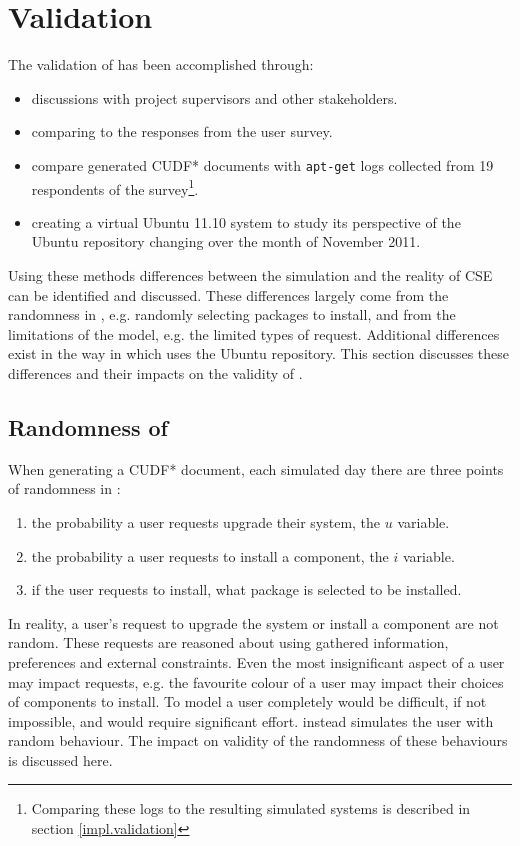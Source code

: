 \section{\usermodel Validation}
\label{sim.modelvalidation}
The validation of \usermodel has been accomplished through:
\begin{itemize}
  \item discussions with project supervisors and other stakeholders.
  \item comparing \usermodel to the responses from the user survey.
  \item compare generated CUDF* documents with \texttt{apt-get} logs collected from 19 
  respondents of the survey\footnote{Comparing these logs to the resulting simulated systems is described in section \ref{impl.validation}}.
  \item creating a virtual Ubuntu 11.10 system to study its perspective of the Ubuntu repository changing over the month of November 2011.
\end{itemize}

Using these methods differences between the simulation and the reality of CSE can be identified and discussed.
These differences largely come from the randomness in \usermodel, e.g. randomly selecting packages to install,
and from the limitations of the model, e.g. the limited types of request.
Additional differences exist in the way in which \usermodel uses the Ubuntu repository.
This section discusses these differences and their impacts on the validity of \usermodel.

\subsection{Randomness of \usermodel}
\label{sim.randomness}
When generating a CUDF* document, each simulated day there are three points of randomness in \usermodel:
\begin{enumerate}
  \item the probability a user requests upgrade their system, the $u$ variable.
  \item the probability a user requests to install a component, the $i$ variable.
  \item if the user requests to install, what package is selected to be installed.
\end{enumerate}
In reality, a user's request to upgrade the system or install a component are not random.
These requests are reasoned about using gathered information, preferences and external constraints.
Even the most insignificant aspect of a user may impact requests, e.g. the favourite colour of a user may impact their choices of components to install.
To model a user completely would be difficult, if not impossible, and would require significant effort.
\usermodel instead simulates the user with random behaviour.
The impact on validity of the randomness of these behaviours is discussed here.

